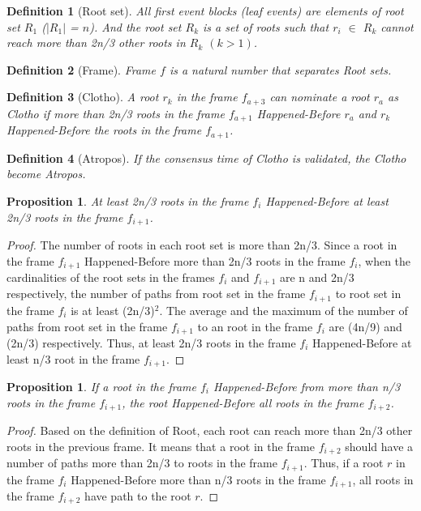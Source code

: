 \documentclass[preprint,12pt]{elsarticle}
\newtheorem{prop}[thm]{Proposition}
\newtheorem{defn}{Definition}[section]
\begin{document}
\begin{defn}[Root set]
All first event blocks (leaf events) are elements of root set $R_1$ ($|R_1|$ = $n$). And the root set $R_k$ is a set of roots such that $r_i$ $\in$ $R_k$ cannot reach more than 2n/3 other roots in $R_k$ $(k > 1)$.  
\end{defn}

\begin{defn}[Frame]
Frame $f$ is a natural number that separates Root sets. 
\end{defn} 

\begin{defn}[Clotho]
A root $r_k$ in the frame $f_{a+3}$ can nominate a root $r_a$ as Clotho if more than 2n/3 roots in the frame $f_{a+1}$ Happened-Before $r_a$ and $r_k$ Happened-Before the roots in the frame $f_{a+1}$.
\end{defn} 

\begin{defn}[Atropos]
If the consensus time of Clotho is validated, the Clotho become Atropos. 
\end{defn}

\begin{prop}
\label{prop:seen}
At least 2n/3 roots in the frame $f_i$ Happened-Before at least 2n/3 roots in the frame $f_{i+1}$. 
\end{prop}

\begin{proof}
The number of roots in each root set is more than 2n/3. Since a root in the frame $f_{i+1}$ Happened-Before more than 2n/3 roots in the frame $f_i$, when the cardinalities of the root sets in the frames $f_i$ and $f_{i+1}$ are n and 2n/3 respectively, the number of paths from root set in the frame $f_{i+1}$ to root set in the frame $f_{i}$ is at least (2n/3)$^{2}$. The average and the maximum of the number of paths from root set in the frame $f_{i+1}$ to an root in the frame $f_{i}$ are (4n/9) and (2n/3) respectively. Thus, at least 2n/3 roots in the frame $f_{i}$ Happened-Before at least n/3 root in the frame $f_{i+1}$. 
\end{proof}

\begin{prop}
\label{prop:share}
If a root in the frame $f_{i}$ Happened-Before from more than n/3 roots in the frame $f_{i+1}$, the root Happened-Before all roots in the frame $f_{i+2}$.
\end{prop}

\begin{proof}
Based on the definition of Root, each root can reach more than 2n/3 other roots in the previous frame. It means that a root in the frame $f_{i+2}$ should have a number of paths more than 2n/3 to roots in the frame $f_{i+1}$. Thus, if a root $r$ in the frame $f_{i}$ Happened-Before more than n/3 roots in the frame $f_{i+1}$, all roots in the frame $f_{i+2}$ have path to the root $r$.
\end{proof}
\end{document}
